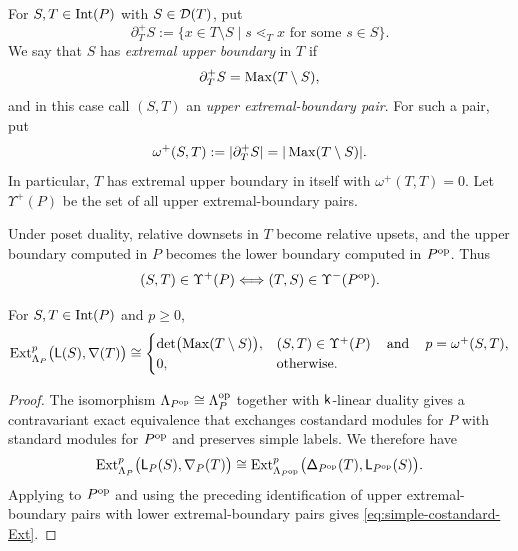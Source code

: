 For $S,T\in \operatorname{Int}(P)$ with $S\in\mathcal D(T)$, put
\[
\partial_T^+S
:=
\{x\in T\setminus S\mid s\lessdot_T x
\text{ for some }s\in S\}.
\]
We say that $S$ has \emph{extremal upper boundary} in $T$ if
\[
\partial_T^+S=\operatorname{Max}(T\setminus S),
\]
and in this case call $(S,T)$ an \emph{upper extremal-boundary pair}.
For such a pair, put
\[
\omega^+(S,T)
:=
|\partial_T^+S|
=
|\operatorname{Max}(T\setminus S)|.
\]
In particular, $T$ has extremal upper boundary in itself with
$\omega^+(T,T)=0$.
Let $\Upsilon^+(P)$ be the set of all upper extremal-boundary pairs.

Under poset duality, relative downsets in $T$ become relative upsets,
and the upper boundary computed in $P$ becomes the lower boundary computed
in $P^{\mathrm{op}}$. Thus
\[
(S,T)\in\Upsilon^+(P)
\Longleftrightarrow
(T,S)\in\Upsilon^-(P^{\mathrm{op}}).
\]

\begin{corollary}
\label{cor:simple-costandard-ext-formula}
For $S,T\in\operatorname{Int}(P)$ and $p\geq0$,
\begin{equation}
\label{eq:simple-costandard-Ext}
\operatorname{Ext}_{\Lambda_P}^p\bigl(\mathsf L(S),\mathsf\nabla(T)\bigr)
\cong
\begin{cases}
\det\bigl(\operatorname{Max}(T\setminus S)\bigr),
&
(S,T)\in\Upsilon^+(P)
\operatorname{\quad \text{and} \quad}\nolimits
p=\omega^+(S,T),
\\
0,
&
\text{otherwise}.
\end{cases}
\end{equation}
\end{corollary}

\begin{proof}
The isomorphism
$\Lambda_{P^{\mathrm{op}}}\cong\Lambda_P^{\mathrm{op}}$ together with $\mathsf{k}$-linear
duality gives a contravariant exact equivalence that exchanges
costandard modules for $P$ with standard modules for $P^{\mathrm{op}}$ and
preserves simple labels. We therefore have
\[
\operatorname{Ext}_{\Lambda_P}^p
\bigl(\mathsf L_P(S),\mathsf\nabla_P(T)\bigr)
\cong
\operatorname{Ext}_{\Lambda_{P^{\mathrm{op}}}}^p
\bigl(\mathsf\Delta_{P^{\mathrm{op}}}(T),\mathsf L_{P^{\mathrm{op}}}(S)\bigr).
\]
Applying  to $P^{\mathrm{op}}$ and using
the preceding identification of upper extremal-boundary pairs with
lower extremal-boundary pairs gives
\eqref{eq:simple-costandard-Ext}.
\end{proof}

